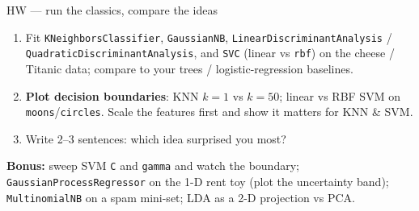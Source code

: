 \documentclass[aspectratio=169]{beamer}
\begin{document}
\begin{frame}{HW --- run the classics, compare the ideas}
  \begin{enumerate}\small
    \item Fit \texttt{KNeighborsClassifier}, \texttt{GaussianNB},
      \texttt{LinearDiscriminantAnalysis} / \texttt{QuadraticDiscriminantAnalysis}, and
      \texttt{SVC} (linear vs \texttt{rbf}) on the cheese / Titanic data; compare to your
      trees / logistic-regression baselines.
    \item \textbf{Plot decision boundaries}: KNN $k=1$ vs $k=50$; linear vs RBF SVM on
      \texttt{moons}/\texttt{circles}. Scale the features first and show it matters for KNN \& SVM.
    \item Write 2--3 sentences: which idea surprised you most?
  \end{enumerate}
  \vskip 2pt
  \textbf{Bonus:} sweep SVM \texttt{C} and \texttt{gamma} and watch the boundary;
  \texttt{GaussianProcessRegressor} on the 1-D rent toy (plot the uncertainty band);
  \texttt{MultinomialNB} on a spam mini-set; LDA as a 2-D projection vs PCA.
\end{frame}
\end{document}
